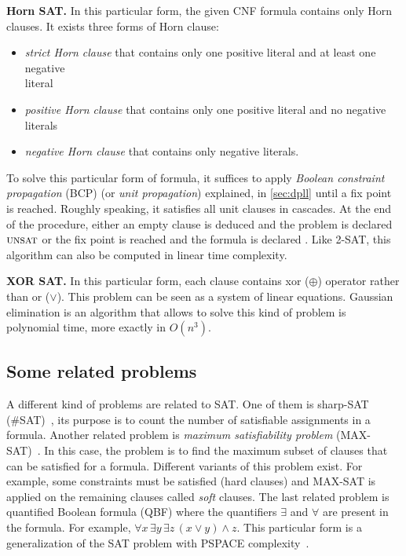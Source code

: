 \textbf{Horn SAT.}\cite{dowling1984linear} In this particular form, the given CNF formula contains only Horn clauses. It exists three forms
of Horn clause: 
\begin{itemize}[topsep=0pt,itemsep=1pt]
\item \emph{strict Horn clause} that contains only one positive literal and at least one negative \\literal
\item \emph{positive Horn clause} that contains only one positive literal and no negative literals
\item \emph{negative Horn clause} that contains only negative literals.
\end{itemize}
To solve this particular form of formula, it suffices to  apply \emph{Boolean constraint propagation} (BCP) (or \emph{unit propagation}) explained, in \cref{sec:dpll} until a fix point
is reached.
Roughly speaking, it satisfies all unit clauses in cascades. At the end of the procedure, either an empty clause is deduced and the problem
is declared $\textsc{unsat}$ or the fix point is reached and the formula is declared \sat.
 Like 2-SAT, this algorithm can also be computed in linear time complexity.
 
\textbf{XOR SAT.}\cite{moore2011nature} In this particular form, each clause contains xor ($\oplus$) operator rather than or ($\lor$).
This problem can be seen as a system of linear equations. Gaussian elimination is an algorithm that allows to solve this kind of
problem is polynomial time, more exactly in $O(n^3)$.

\subsection{Some related problems}
A different kind of problems are related to SAT.%
One of them is sharp-SAT (\#SAT)~\cite{valiant1979complexity}, its purpose is to count the number of satisfiable assignments in a formula.
Another related problem is \textit{maximum satisfiability problem} (MAX-SAT)~\cite{biere2009handbook}. In this case, the problem
is to find the maximum subset of clauses that can be satisfied for a formula. Different variants
of this problem exist. For example, some constraints must be satisfied (hard clauses) and MAX-SAT
is applied on the remaining clauses called \emph{soft} clauses.
The last related problem is quantified Boolean formula (QBF) where the quantifiers $\exists$ and
$\forall$ are present in the formula. For example, $\forall x\, \exists y\, \exists z \, (x \lor y) \land z$.
This particular form is a generalization of the SAT problem with PSPACE complexity~\cite{garey2002computers}.
